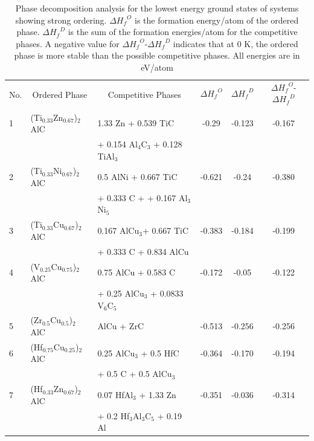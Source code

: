 \documentclass[preprint,amsmath,amssymb,aps, prb,showkeys]{revtex4-1}
\begin{document}
\begin{table}[htp!]
\centering
\setlength\extrarowheight{4.5pt}
\begin{tabular}{lllccc}
\hline
\multicolumn{1}{c}{\multirow{2}{*}{No.}} & \multicolumn{1}{c}{\multirow{2}{*}{Ordered Phase}} & \multicolumn{1}{c}{\multirow{2}{*}{Competitive Phases}} &  $\Delta {H_f} ^O$ & $\Delta {H_f} ^D$ & $\Delta {H_f} ^O$-$\Delta {H_f} ^D$ \\
\multicolumn{1}{c}{} & \multicolumn{1}{c}{} & \multicolumn{1}{c}{} &  & &  \\
\hline \hline
1 & (Ti$_{0.33}$Zn$_{0.67}$)$_2$AlC & 1.33 Zn + 0.539 TiC & -0.29 & -0.123 & -0.167 \\
& &  + 0.154 Al$_4$C$_3$ + 0.128 TiAl$_3$ & & & \\

2 & (Ti$_{0.33}$Ni$_{0.67}$)$_2$AlC & 0.5 AlNi + 0.667 TiC  & -0.621 & -0.24 & -0.380 \\
& &  + 0.333 C + + 0.167 Al$_3$Ni$_5$ & & & \\

3 & (Ti$_{0.33}$Cu$_{0.67}$)$_2$AlC & 0.167 AlCu$_3$+ 0.667 TiC  & -0.383 & -0.184 & -0.199 \\
& &  + 0.333 C + 0.834 AlCu & & & \\

4 & (V$_{0.25}$Cu$_{0.75}$)$_2$AlC & 0.75 AlCu + 0.583 C    & -0.172 & -0.05 & -0.122 \\
& & + 0.25 AlCu$_3$ + 0.0833 V$_6$C$_5$ & & & \\

5 & (Zr$_{0.5}$Cu$_{0.5}$)$_2$AlC & AlCu + ZrC & -0.513 & -0.256 & -0.256 \\

6 & (Hf$_{0.75}$Cu$_{0.25}$)$_2$AlC & 0.25 AlCu$_3$ + 0.5 HfC   & -0.364  &-0.170 & -0.194 \\
& &  + 0.5 C + 0.5 AlCu$_3$& & & \\

7 & (Hf$_{0.33}$Zn$_{0.67}$)$_2$AlC & 0.07 HfAl$_3$ + 1.33 Zn & -0.351 & -0.036 & -0.314 \\
& &  + 0.2 Hf$_3$Al$_3$C$_5$ + 0.19 Al   & & & \\

\hline \hline
\end{tabular}
\caption{Phase decomposition analysis for the lowest energy ground states of systems showing strong ordering. $\Delta {H_f} ^O$ is the formation energy/atom of the ordered phase. $\Delta {H_f} ^D$ is the sum of the formation energies/atom for the competitive phases. A negative value for $\Delta {H_f} ^O$-$\Delta {H_f} ^D$  indicates that at 0 K, the ordered phase is more stable than the possible competitive phases. All energies are in eV/atom }
\end{table}
\end{document}
